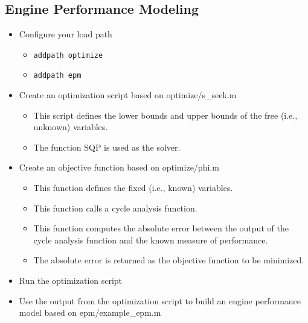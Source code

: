 \documentclass{article}
\begin{document}
\subsection{Engine Performance Modeling}
\begin{itemize}
\item Configure your load path
  \begin{itemize}
  \item \texttt{addpath optimize}
  \item \texttt{addpath epm}
  \end{itemize}
\item Create an optimization script based on optimize/s\_seek.m
  \begin{itemize}
  \item This script defines the lower bounds and upper bounds of the
    free (i.e., unknown) variables.
  \item The function SQP is used as the solver.
  \end{itemize}
\item Create an objective function based on optimize/phi.m
  \begin{itemize}
  \item This function defines the fixed (i.e., known) variables.
  \item This function calls a cycle analysis function.
  \item This function computes the absolute error between the output
    of the cycle analysis function and the known measure of
    performance.
  \item The absolute error is returned as the objective function to be
    minimized.
  \end{itemize}
\item Run the optimization script
\item Use the output from the optimization script to build an engine
  performance model based on epm/example\_epm.m
\end{itemize}
\end{document}
